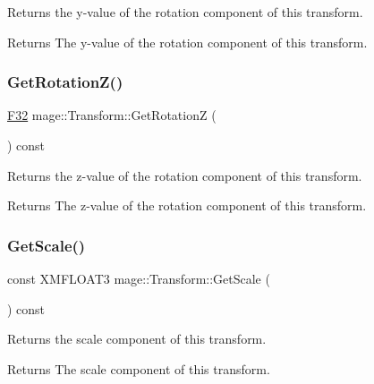 Returns the y-\/value of the rotation component of this transform.

\begin{DoxyReturn}{Returns}
The y-\/value of the rotation component of this transform. 
\end{DoxyReturn}
\hypertarget{structmage_1_1_transform_a1c2ae96eb6c0d33afd406ca1685b74f5}{}\label{structmage_1_1_transform_a1c2ae96eb6c0d33afd406ca1685b74f5} 
\subsubsection{\texorpdfstring{Get\+Rotation\+Z()}{GetRotationZ()}}
{\footnotesize\ttfamily \hyperlink{namespacemage_aa97e833b45f06d60a0a9c4fc22ae02c0}{F32} mage\+::\+Transform\+::\+Get\+RotationZ (\begin{DoxyParamCaption}{ }\end{DoxyParamCaption}) const\hspace{0.3cm}{\ttfamily [noexcept]}}

Returns the z-\/value of the rotation component of this transform.

\begin{DoxyReturn}{Returns}
The z-\/value of the rotation component of this transform. 
\end{DoxyReturn}
\hypertarget{structmage_1_1_transform_a0f63b2450b9ecb066bf4e34707d9148e}{}\label{structmage_1_1_transform_a0f63b2450b9ecb066bf4e34707d9148e} 
\subsubsection{\texorpdfstring{Get\+Scale()}{GetScale()}}
{\footnotesize\ttfamily const X\+M\+F\+L\+O\+A\+T3 mage\+::\+Transform\+::\+Get\+Scale (\begin{DoxyParamCaption}{ }\end{DoxyParamCaption}) const\hspace{0.3cm}{\ttfamily [noexcept]}}

Returns the scale component of this transform.

\begin{DoxyReturn}{Returns}
The scale component of this transform. 
\end{DoxyReturn}
\hypertarget{structmage_1_1_transform_a86eff370d6cb37a7aa5f7d78d4cf3cf4}{}\label{structmage_1_1_transform_a86eff370d6cb37a7aa5f7d78d4cf3cf4} 
